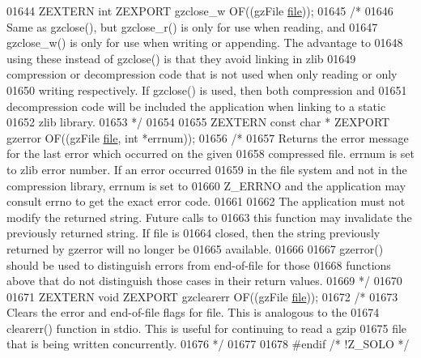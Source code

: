 \begin{DoxyCode}
01644 ZEXTERN \textcolor{keywordtype}{int} ZEXPORT gzclose\_w OF((gzFile \hyperlink{structfile}{file}));
01645 \textcolor{comment}{/*}
01646 \textcolor{comment}{     Same as gzclose(), but gzclose\_r() is only for use when reading, and}
01647 \textcolor{comment}{   gzclose\_w() is only for use when writing or appending.  The advantage to}
01648 \textcolor{comment}{   using these instead of gzclose() is that they avoid linking in zlib}
01649 \textcolor{comment}{   compression or decompression code that is not used when only reading or only}
01650 \textcolor{comment}{   writing respectively.  If gzclose() is used, then both compression and}
01651 \textcolor{comment}{   decompression code will be included the application when linking to a static}
01652 \textcolor{comment}{   zlib library.}
01653 \textcolor{comment}{*/}
01654 
01655 ZEXTERN \textcolor{keyword}{const} \textcolor{keywordtype}{char} * ZEXPORT gzerror OF((gzFile \hyperlink{structfile}{file}, \textcolor{keywordtype}{int} *errnum));
01656 \textcolor{comment}{/*}
01657 \textcolor{comment}{     Returns the error message for the last error which occurred on the given}
01658 \textcolor{comment}{   compressed file.  errnum is set to zlib error number.  If an error occurred}
01659 \textcolor{comment}{   in the file system and not in the compression library, errnum is set to}
01660 \textcolor{comment}{   Z\_ERRNO and the application may consult errno to get the exact error code.}
01661 \textcolor{comment}{}
01662 \textcolor{comment}{     The application must not modify the returned string.  Future calls to}
01663 \textcolor{comment}{   this function may invalidate the previously returned string.  If file is}
01664 \textcolor{comment}{   closed, then the string previously returned by gzerror will no longer be}
01665 \textcolor{comment}{   available.}
01666 \textcolor{comment}{}
01667 \textcolor{comment}{     gzerror() should be used to distinguish errors from end-of-file for those}
01668 \textcolor{comment}{   functions above that do not distinguish those cases in their return values.}
01669 \textcolor{comment}{*/}
01670 
01671 ZEXTERN \textcolor{keywordtype}{void} ZEXPORT gzclearerr OF((gzFile \hyperlink{structfile}{file}));
01672 \textcolor{comment}{/*}
01673 \textcolor{comment}{     Clears the error and end-of-file flags for file.  This is analogous to the}
01674 \textcolor{comment}{   clearerr() function in stdio.  This is useful for continuing to read a gzip}
01675 \textcolor{comment}{   file that is being written concurrently.}
01676 \textcolor{comment}{*/}
01677 
01678 \textcolor{preprocessor}{#endif }\textcolor{comment}{/* !Z\_SOLO */}\textcolor{preprocessor}{}

\end{DoxyCode}
